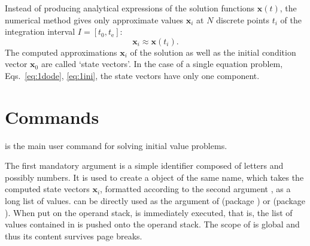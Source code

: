 \documentclass[11pt,english,BCOR10mm,DIV12,bibliography=totoc,parskip=false,smallheadings
    headexclude,footexclude,oneside,dvips]{pst-doc}
\begin{document}
Instead of producing analytical expressions of the solution functions $\mathbf{x}(t)$, the numerical method gives only approximate values $\mathbf{x}_i$ at $N$ discrete points $t_i$ of the integration interval $I=[t_0, t_\mathrm{e}]$:
\begin{equation}
\mathbf{x}_i\approx\mathbf{x}(t_i).
\end{equation}
The computed approximations $\mathbf{x}_i$ of the solution as well as the initial condition vector $\mathbf{x}_0$ are called `state vectors'. In the case of a single equation problem, Eqs.~\eqref{eq:1dode}, \eqref{eq:1ini}, the state vectors have only one component.

\section{Commands}
\begin{BDef}
	\OptArgs{}
\end{BDef}
is the main user command for solving initial value problems.

The first mandatory argument  is a simple identifier composed of letters and possibly numbers. It is used to create a \PS{} object of the same name, which takes the computed state vectors $\mathbf{x}_i$, formatted according to the second argument , as a long list of values.  can be directly used as the  argument of  (package ) or  (package ). When put on the \PS{} operand stack,  is immediately executed, that is, the list of values contained in  is pushed onto the operand stack. The scope of  is global and thus its content survives page breaks.
\end{document}
